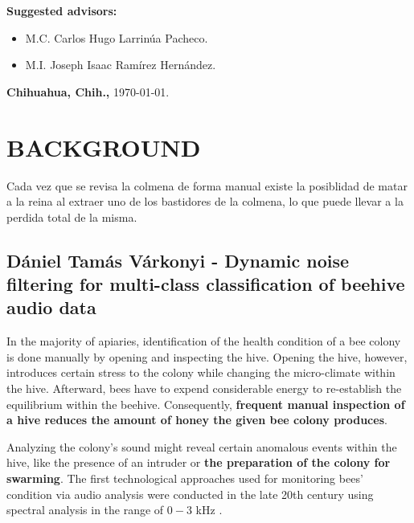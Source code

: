 \documentclass[12pt]{report}
\begin{document}
\begin{titlepage}
\begin{center}
			{\large \textbf{Suggested advisors:}}\\[3.5ex]
			\begin{itemize}
				\item {\large M.C. Carlos Hugo Larrinúa Pacheco.}\\[3.5ex]
				\item {\large M.I. Joseph Isaac Ramírez Hernández.}\\[3.5ex]
			\end{itemize}
			\vfill
			{\large \textbf{Chihuahua, Chih.,} \today.}\\[3.5ex]
		\end{center}
	\end{titlepage}
	
	
	
	\chapter{BACKGROUND}
	
	Cada vez que se revisa la colmena de forma manual existe la posiblidad de matar a la reina al extraer uno de los bastidores de la colmena, lo que puede llevar a la perdida total de la misma.
	
	\section{Dániel Tamás Várkonyi - Dynamic noise filtering for multi-class classification of beehive audio data}
	
	In the majority of apiaries, identification of the health condition of a bee colony is done manually by opening and inspecting the hive. Opening the hive, however, introduces certain stress to the colony while changing the micro-climate within the hive. Afterward, bees have to expend considerable energy to re-establish the equilibrium within the beehive. Consequently, \textbf{frequent manual inspection of a hive reduces the amount of honey the given bee colony produces}.
	
	\par Analyzing the colony's sound might reveal certain anomalous events within the hive, like the presence of an intruder or \textbf{the preparation of the colony for swarming}. The first technological approaches used for monitoring bees' condition via audio analysis were conducted in the late 20th century using spectral analysis in the range of $0-3$ kHz \cite{dietlein1985spectral_analysis}.
	
\end{document}
